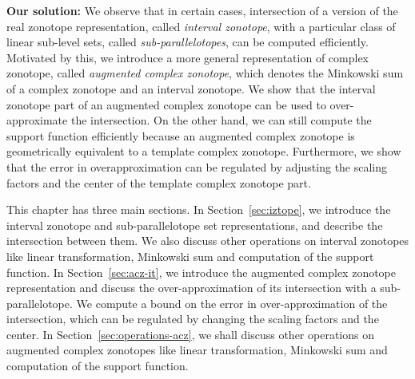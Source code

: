 {\bf Our solution: } We observe that in certain cases, intersection of
a version of the real zonotope representation, called \emph{interval
zonotope}, with a particular class of linear sub-level sets,
called \emph{sub-parallelotopes}, can be computed efficiently.
Motivated by this, we introduce a more general representation of
complex zonotope, called \emph{augmented complex zonotope}, which
denotes the Minkowski sum of a complex zonotope and an interval
zonotope.  We show that the interval zonotope part of an augmented
complex zonotope can be used to over-approximate the intersection.  On
the other hand, we can still compute the support function efficiently
because an augmented complex zonotope is geometrically equivalent to a
template complex zonotope.  Furthermore, we show that the error in
overapproximation can be regulated by adjusting the scaling factors
and the center of the template complex zonotope part.

This chapter has three main sections.  In Section~\ref{sec:iztope}, we
introduce the interval zonotope and sub-parallelotope set
representations, and describe the intersection between them.  We also
discuss other operations on interval zonotopes like linear
transformation, Minkowski sum and computation of the support function.
In Section~\ref{sec:acz-it}, we introduce the augmented complex
zonotope representation and discuss the over-approximation of its
intersection with a sub-parallelotope.  We compute a bound on the
error in over-approximation of the intersection, which can be regulated
by changing the scaling factors and the center.  In
Section~\ref{sec:operations-acz}, we shall discuss other operations on
augmented complex zonotopes like linear transformation, Minkowski sum
and computation of the support function.
